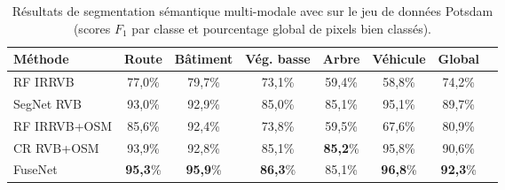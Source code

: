 
\begin{table}[t]
	\caption{Résultats de segmentation sémantique multi-modale avec  sur le jeu de données  Potsdam (scores $F_1$ par classe et pourcentage global de pixels bien classés).}
    \label{table_potsdam_results}
	\begin{tabularx}{\textwidth}{Y c c c c c c c}
    \toprule
    Méthode                 & Route     & Bâtiment& Vég. basse  & Arbre   & Véhicule & Global\\
    \midrule
    RF \gls{IRRVB}          & 77,0\%    & 79,7\%  & 73,1\%      & 59,4\%  & 58,8\%   & 74,2\%\\
    SegNet \gls{RVB}        & 93,0\%    &	92,9\%	&	85,0\%      &	85,1\%  &	95,1\%	 & 89,7\%\\
    \midrule
    RF \gls{IRRVB}+\gls{OSM}& 85,6\%    & 92,4\%  & 73,8\%      & 59,5\%  & 67,6\%   & 80,9\%\\
    CR \gls{RVB}+\gls{OSM}  &	93,9\%    &	92,8\%	&	85,1\%		  &	\textbf{85,2}\%    &	95,8\%	&	90,6\%\\
    FuseNet                 &	\textbf{95,3}\%	&	\textbf{95,9}\%	&	\textbf{86,3}\%	   &	85,1\%	&	\textbf{96,8}\%	&	\textbf{92,3}\%\\
    \bottomrule
    \end{tabularx}
\end{table}


